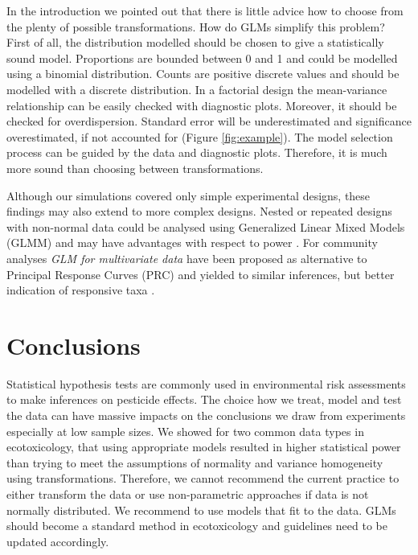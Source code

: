 \documentclass{scrartcl}
\begin{document}
In the introduction we pointed out that there is little advice how to choose from the plenty of possible transformations.
How do GLMs simplify this problem?
First of all, the distribution modelled should be chosen to give a statistically sound model.
Proportions are bounded between 0 and 1 and could be modelled using a binomial distribution.
Counts are positive discrete values and should be modelled with a discrete distribution.
In a factorial design the mean-variance relationship can be easily checked with diagnostic plots.
Moreover, it should be checked for overdispersion. 
Standard error will be underestimated and significance overestimated, if not accounted for (Figure \ref{fig:example}).
The model selection process can be guided by the data and diagnostic plots. Therefore, it is much more sound than choosing between transformations.


Although our simulations covered only simple experimental designs, these findings may also extend to more complex designs. 
Nested or repeated designs with non-normal data could be analysed using Generalized Linear Mixed Models (GLMM) and may have advantages with respect to power \citep{stroup_rethinking_2014}.
For community analyses \emph{GLM for multivariate data} have been proposed as alternative to Principal Response Curves (PRC) and yielded to similar inferences, but better indication of responsive taxa \citep{warton_distance-based_2012,szocs_analysing_2015}.



\section{Conclusions}
\label{sec:concl}
Statistical hypothesis tests are commonly used in environmental risk assessments  to make inferences on pesticide effects.
The choice how we treat, model and test the data can have massive impacts on the conclusions we draw from experiments especially at low sample sizes.
We showed for two common data types in ecotoxicology, that using appropriate models resulted in higher statistical power than trying to meet the assumptions of normality and variance homogeneity using transformations. 
Therefore, we cannot recommend the current practice to either transform the data or use non-parametric approaches if data is not normally distributed.
We recommend to use models that fit to the data. 
GLMs should become a standard method in ecotoxicology and guidelines need to be updated accordingly.





\end{document}
